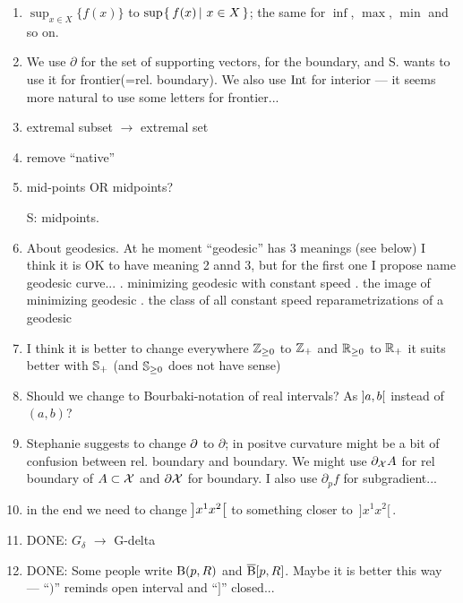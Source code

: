 \begin{enumerate}
\item $\sup_{x\in X}\{f(x)\}$ to $\sup\set{f(x)}{x\in X}$;
the same for $\inf$, $\max$, $\min$ and so on.

\item We use $\partial$ for the set of supporting vectors, for the boundary, and S. wants to use it for frontier(=rel. boundary). We also use $\mathop{\rm Int}\nolimits$ for interior --- it seems more natural to use some letters for frontier...

\item extremal subset $\to$ extremal set

\item remove ``native''

\item mid-points OR midpoints?  

S: midpoints.

\item About geodesics. At he moment ``geodesic'' has 3 meanings (see below) I think it is OK to have meaning 2 annd 3, but for the first one I propose name geodesic curve...
. minimizing geodesic with constant speed
. the image of minimizing geodesic
. the class of all constant speed reparametrizations of a geodesic 

\item I think it is better to change everywhere $\ZZ_{\ge0}$ to $\mathbb{Z}_+$ and $\RR_{\ge0}$ to $\mathbb{R}_+$ it suits better with $\mathbb{S}_+$ (and $\SS_{\ge0}$ does not have sense)

\item Should we change to Bourbaki-notation of real intervals? As $\hskip-0.1em\left]a,b\right[$ instead of $(a,b)$?

\item Stephanie suggests to change $\partial$ to $\partial$; in positve curvature might be  a bit of confusion between rel. boundary and boundary. We might use $\partial_{\mathcal{X}}A$ for rel boundary of $A\subset \spc{X}$ and $\partial\mathcal{X}$ for boundary. I also use $\partial_p f$ for subgradient...

\item in the end we need to change $\hskip-0.1em\left]x^1x^2\right[$ to something closer to 
$\,{]}x^1x^2{[}\,$.

\item DONE: $G_\delta$ $\to$ G-delta

\item DONE: Some people write $\mathrm{B}{}(p,R)$ and $\overline{\mathrm{B}}{}[p,R]$. 
Maybe it is better this way --- ``$)$'' reminds open interval and ``$]$'' closed...


\end{enumerate}
